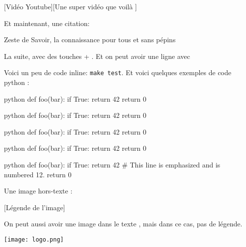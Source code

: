 \documentclass[small]{zmdocument}
\begin{document}
[Vidéo Youtube][Une super vidéo que voilà ]


Et maintenant, une citation:

\begin{Quotation}[Clem]
Zeste de Savoir, la connaissance pour tous et sans pépins
\end{Quotation}

La suite, avec des touches  + . Et on peut avoir une ligne avec

\horizontalLine

Voici un peu de code inline: \verb`make test`. Et voici quelques exemples de code python :

\begin{codeBlock}{python}
def foo(bar):
    if True:
        return 42
    return 0
\end{codeBlock}

\begin{codeBlock}{python}
def foo(bar):
    if True:
        return 42
    return 0
\end{codeBlock}

\begin{codeBlock}{python}
def foo(bar):
    if True:
        return 42
    return 0
\end{codeBlock}

\begin{codeBlock}[][1, 3-4]{python}
def foo(bar):
    if True:
        return 42
    return 0
\end{codeBlock}

\begin{codeBlock}[][12][10]{python}
def foo(bar): 
    if True:
        return 42 # This line is emphasized and is numbered 12.
    return 0
\end{codeBlock}

Une image hors-texte :

[Légende de l’image]

On peut aussi avoir une image dans le texte , mais dans ce cas, pas de légende.

\begin{center}
\texttt{[image: logo.png]}
\end{center}
\end{document}

